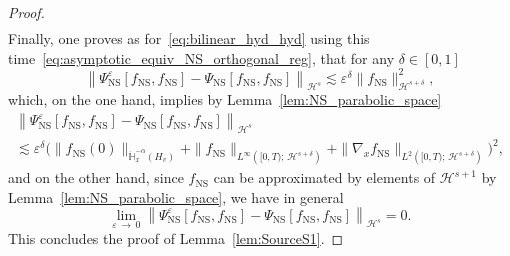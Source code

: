 \documentclass[10pt]{amsart}
\theoremstyle{definition}\newtheorem{defi}[theo]{Definition}\newtheorem{rema}[theo]{Remark}\newtheorem{exam}[theo]{Example}\newtheorem{exem}[theo]{Example}\newtheorem{nota}[theo]{Notation}
\newcommand{\ns}{\mathrm{NS}}
\newcommand{\bbH}{\mathbb{H}}
\newcommand{\HH}{\mathcal{H}}
\newcommand{\HHH}{\mathscr{H}}
\newcommand{\Ss}{H}
\newcommand{\rSSs}[1]{\HH^{#1}}
\newcommand{\rSSSs}[1]{\HHH^{#1}}
\newcommand*\eps{{\varepsilon}}
\begin{document}
\begin{proof}
\begin{multline*}
\end{multline*}
Finally, one proves as for~\eqref{eq:bilinear_hyd_hyd} using this time~\eqref{eq:asymptotic_equiv_NS_orthogonal_reg}, that for any $\delta \in [0, 1]$
\[
\left\| \Psi^\eps_\ns\left[f_\ns, f_\ns\right] - \Psi_\ns\left[f_\ns, f_\ns\right] \right\|_{ \rSSSs{s} } \lesssim \eps^{\delta} \| f_\ns \|_{\rSSSs{s+\delta}}^2,
\]
which, on the one hand, implies by Lemma~\ref{lem:NS_parabolic_space}
\begin{multline*}
\left\| \Psi^\eps_\ns \left[f_\ns, f_\ns\right] - \Psi_\ns\left[f_\ns, f_\ns\right] \right\|_{ \rSSSs{s} } \\
 \lesssim \eps^{\delta} \Big(\| f_\ns(0) \|_{ \dot{\bbH}^{-\alpha}_x \left(\Ss_v \right) } + \| f_\ns \|_{ L^\infty\left([0, T);\,\rSSs{s+\delta} \right) } + \| \nabla_x f_\ns \|_{ L^2\left([0, T);\,\rSSs{s+\delta} \right) }\Big)^2,
\end{multline*}
and on the other hand, since $f_\ns$ can be approximated by elements of $\rSSSs{s+1}$ by Lemma~\ref{lem:NS_parabolic_space}, we have in general
\[
\lim_{\eps\,\to\,0}\left\| \Psi^\eps_\ns\left[f_\ns, f_\ns\right] - \Psi_\ns\left[f_\ns, f_\ns\right] \right\|_{ \rSSSs{s} }=0.
\]
This concludes the proof of Lemma~\ref{lem:SourceS1}.
\end{proof}
\end{document}
